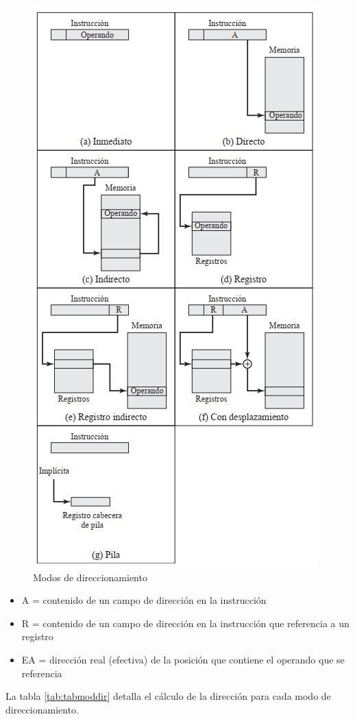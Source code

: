\documentclass[12pt,oneside]{templates/unerthesis}
\providecommand{\tightlist}{%
  \setlength{\itemsep}{0pt}\setlength{\parskip}{0pt}}
\begin{document}
\begin{figure}

{\centering \includegraphics[width=0.6\linewidth]{images/modosdireccionamiento} 

}

\caption{Modos de direccionamiento }\label{fig:ModDir}
\end{figure}

\begin{itemize}
\tightlist
\item
  A = contenido de un campo de dirección en la instrucción
\item
  R = contenido de un campo de dirección en la instrucción que referencia a un registro
\item
  EA = dirección real (efectiva) de la posición que contiene el operando que se referencia
\end{itemize}

La tabla \ref{tab:tabmoddir} detalla el cálculo de la dirección para cada modo de direccionamiento.
\end{document}
